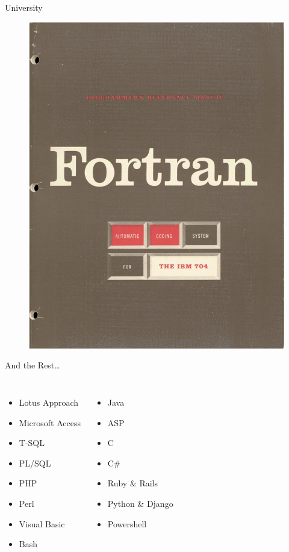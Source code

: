 \documentclass{beamer}
\begin{document}
\begin{frame}{University}
\begin{figure}
      \includegraphics[scale=0.1]{images/fortran}
    \end{figure}
  \end{frame}

  \begin{frame}{And the Rest\ldots}
    \begin{columns}
          \begin{itemize}
            \item Lotus Approach
            \item Microsoft Access
            \item T-SQL
            \item PL/SQL
            \item PHP
            \item Perl
            \item Visual Basic
            \item Bash
          \end{itemize}
          \begin{itemize}
            \item Java
            \item ASP
            \item C
            \item C\#
            \item Ruby \& Rails
            \item Python \& Django
            \item Powershell
          \end{itemize}
      \end{columns}
  \end{frame}
\end{document}
